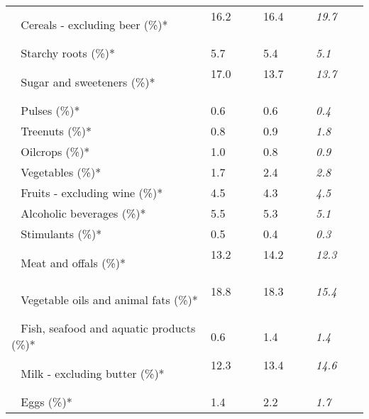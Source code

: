 \begin{tabular}{L{3.9cm} R{1cm} R{1cm} R{1cm}}
	 ~ Cereals - excluding beer (\%)* & 16.2 ~ \ \ & 16.4 ~ \ \ & \textit{19.7} ~ \ \ \\ 
	 ~ Starchy roots (\%)* & 5.7 ~ \ \ & 5.4 ~ \ \ & \textit{5.1} ~ \ \ \\ 
	 ~ Sugar and sweeteners (\%)* & 17.0 ~ \ \ & 13.7 ~ \ \ & \textit{13.7} ~ \ \ \\ 
	 ~ Pulses (\%)* & 0.6 ~ \ \ & 0.6 ~ \ \ & \textit{0.4} ~ \ \ \\ 
	 ~ Treenuts (\%)* & 0.8 ~ \ \ & 0.9 ~ \ \ & \textit{1.8} ~ \ \ \\ 
	 ~ Oilcrops (\%)* & 1.0 ~ \ \ & 0.8 ~ \ \ & \textit{0.9} ~ \ \ \\ 
	 ~ Vegetables (\%)* & 1.7 ~ \ \ & 2.4 ~ \ \ & \textit{2.8} ~ \ \ \\ 
	 ~ Fruits - excluding wine (\%)* & 4.5 ~ \ \ & 4.3 ~ \ \ & \textit{4.5} ~ \ \ \\ 
	 ~ Alcoholic beverages (\%)* & 5.5 ~ \ \ & 5.3 ~ \ \ & \textit{5.1} ~ \ \ \\ 
	 ~ Stimulants (\%)* & 0.5 ~ \ \ & 0.4 ~ \ \ & \textit{0.3} ~ \ \ \\ 
	 ~ Meat and offals (\%)* & 13.2 ~ \ \ & 14.2 ~ \ \ & \textit{12.3} ~ \ \ \\ 
	 ~ Vegetable oils and animal fats (\%)* & 18.8 ~ \ \ & 18.3 ~ \ \ & \textit{15.4} ~ \ \ \\ 
	 ~ Fish, seafood and aquatic products (\%)* & 0.6 ~ \ \ & 1.4 ~ \ \ & \textit{1.4} ~ \ \ \\ 
	 ~ Milk - excluding butter (\%)* & 12.3 ~ \ \ & 13.4 ~ \ \ & \textit{14.6} ~ \ \ \\ 
	 ~ Eggs (\%)* & 1.4 ~ \ \ & 2.2 ~ \ \ & \textit{1.7} ~ \ \ \\ 
       \toprule
      \end{tabular}
      \clearpage
{}
